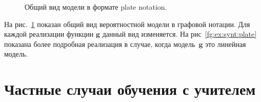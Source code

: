 \documentclass[12pt, twoside]{article}
\begin{document}
\begin{figure}
\begin{center}
\end{center}
\caption{Общий вид модели в формате plate notation.}
\label{fg:st:plate}
\end{figure}

На рис.~\ref{fg:st:plate} показан общий вид вероятностной модели в графовой нотации. Для каждой реализации функции $\mathbf{g}$ данный вид изменяется. На рис~\ref{fg:ex:synt:plate} показана более подробная реализация в случае, когда модель~$\mathbf{g}$ это линейная модель.

\section{Частные случаи обучения с учителем}
\end{document}
